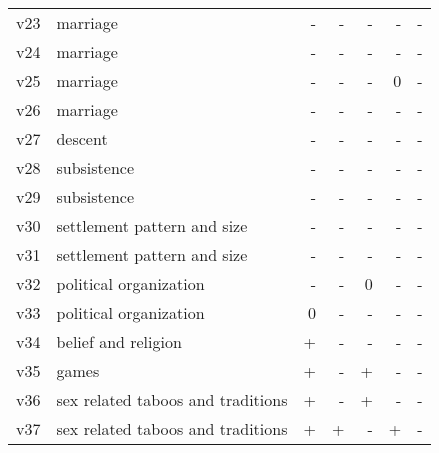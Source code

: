 \documentclass[12pt, a4paper]{article}
\begin{document}
\begin{table}
{\begin{tabular}{llrrrrr}
    v23 & marriage & \cellcolor{myred} - & \cellcolor{myred} - & \cellcolor{myred} - & \cellcolor{myred} - & \cellcolor{myred} -\\
    v24 & marriage & \cellcolor{myred} - & \cellcolor{myred} - & \cellcolor{myred} - & \cellcolor{myred} - & \cellcolor{myred} -\\
    v25 & marriage & \cellcolor{myred} - & \cellcolor{myred} - & \cellcolor{myred} - & 0 & \cellcolor{myred} -\\
    v26 & marriage & \cellcolor{myred} - & \cellcolor{myred} - & \cellcolor{myred} - & \cellcolor{myred} - & \cellcolor{myred} -\\
    v27 & descent & \cellcolor{myred} - & \cellcolor{myred} - & \cellcolor{myred} - & \cellcolor{myred} - & \cellcolor{myred} -\\
    v28 & subsistence & \cellcolor{myred} - & \cellcolor{myred} - & \cellcolor{myred} - & \cellcolor{myred} - & \cellcolor{myred} -\\
    v29 & subsistence & \cellcolor{myred} - & \cellcolor{myred} - & \cellcolor{myred} - & \cellcolor{myred} - & \cellcolor{myred} -\\
    v30 & settlement pattern and size & \cellcolor{myred} - & \cellcolor{myred} - & \cellcolor{myred} - & \cellcolor{myred} - & \cellcolor{myred} -\\
    v31 & settlement pattern and size & \cellcolor{myred} - & \cellcolor{myred} - & \cellcolor{myred} - & \cellcolor{myred} - & \cellcolor{myred} -\\
    v32 & political organization & \cellcolor{myred} - & \cellcolor{myred} - & 0 & \cellcolor{myred} - & \cellcolor{myred} -\\
    v33 & political organization & 0 & \cellcolor{myred} - & \cellcolor{myred} - & \cellcolor{myred} - & \cellcolor{myred} -\\
    v34 & belief and religion & \cellcolor{myblue} + & \cellcolor{myred} - & \cellcolor{myred} - & \cellcolor{myred} - & \cellcolor{myred} -\\
    v35 & games & \cellcolor{myblue} + & \cellcolor{myred} - & \cellcolor{myblue} + & \cellcolor{myred} - & \cellcolor{myred} -\\
    v36 & sex related taboos and traditions & \cellcolor{myblue} + & \cellcolor{myred} - & \cellcolor{myblue} + & \cellcolor{myred} - & \cellcolor{myred} -\\
    v37 & sex related taboos and traditions & \cellcolor{myblue} + & \cellcolor{myblue} + & \cellcolor{myred} - & \cellcolor{myblue} + & \cellcolor{myred} -\\

\end{tabular}}
\end{table}
\end{document}
